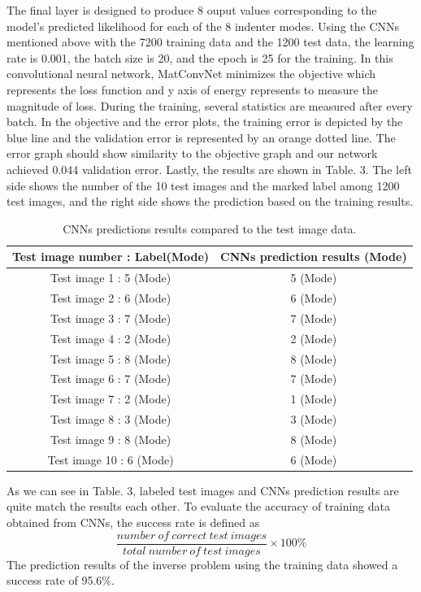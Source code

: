 The final layer is designed to produce 8 ouput values corresponding to the model's predicted likelihood for each of the 8 indenter modes.
Using the CNNs mentioned above with the 7200 training data and the 1200 test data, the learning rate is 0.001, the batch size is 20, and the epoch is 25 for the training. 
In this convolutional neural network, MatConvNet minimizes the objective which represents the loss function and y axis of energy represents to measure the magnitude of loss.
During the training, several statistics are measured after every batch.
In the objective and the error plots, the training error is depicted by the blue line and the validation error is represented by an orange dotted line. The error graph should show similarity to the objective graph and our network achieved 0.044 validation error. Lastly, the results are shown in Table. 3. The left side shows the number of the 10 test images and the marked label among 1200 test images, and the right side shows the prediction based on the training results.
\begin{table}[h!]
\centering
\caption{CNNs predictions results compared to the test image data.}
\label{tab:1}       
\begin{tabular}{c|c}
\hline
\hline
Test image number : Label(Mode) & CNNs prediction results (Mode) \\
\hline
Test image 1 : 5 (Mode) & 5 (Mode) \\
Test image 2 : 6 (Mode) & 6 (Mode) \\
Test image 3 : 7 (Mode) & 7 (Mode) \\
Test image 4 : 2 (Mode) & 2 (Mode) \\
Test image 5 : 8 (Mode) & 8 (Mode) \\
Test image 6 : 7 (Mode) & 7 (Mode) \\
Test image 7 : 2 (Mode) & 1 (Mode) \\
Test image 8 : 3 (Mode) & 3 (Mode) \\
Test image 9 : 8 (Mode) & 8 (Mode) \\
Test image 10 : 6 (Mode) & 6 (Mode) \\
\hline
\end{tabular}
\end{table}
As we can see in Table. 3, labeled test images and CNNs prediction results are quite match the results each other. To evaluate the accuracy of training data obtained from CNNs, the success rate is defined as
\begin{equation} 
\frac{number\ of\ correct\ test\ images}{total\ number\ of\ test\ images} \times 100\%
\end{equation}
The prediction results of the inverse problem using the training data showed a success rate of 95.6\%.

